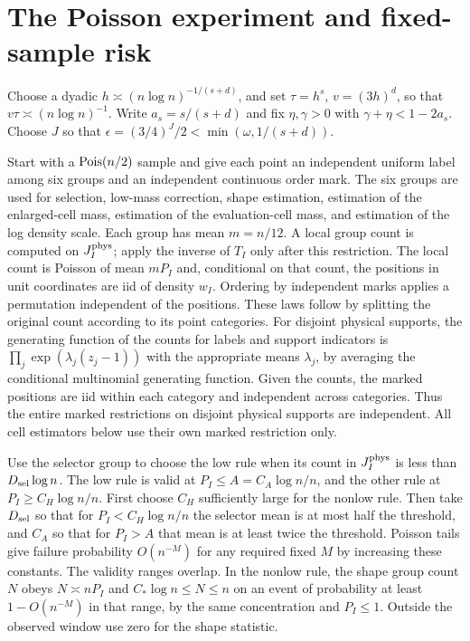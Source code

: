 \section{The Poisson experiment and fixed-sample risk}\label{sec:risk}

Choose a dyadic \(h\asymp(n\log n)^{-1/(s+d)}\), and set
\(\tau=h^s\), \(v=(3h)^d\), so that \(v\tau\asymp(n\log n)^{-1}\).
Write \(a_s=s/(s+d)\) and fix \(\eta,\gamma>0\) with
\(\gamma+\eta<1-2a_s\). Choose \(J\) so that
\(\epsilon=(3/4)^J/2<\min(\omega,1/(s+d))\).

Start with a \(\operatorname{Pois}(n/2)\) sample and give each point an
independent uniform label among six groups and an independent
continuous order mark. The six groups are used for selection,
low-mass correction, shape estimation, estimation of the
enlarged-cell mass, estimation of the evaluation-cell mass,
and estimation of the log density scale. Each group has
mean \(m=n/12\).
A local group count is computed on \(J_I^{\rm phys}\);
apply the inverse of \(T_I\) only after this restriction.
The local count is Poisson of mean \(mP_I\) and, conditional
on that count, the positions in unit coordinates are iid
of density \(w_I\). Ordering by independent marks applies a
permutation independent of the positions. These laws follow
by splitting the original count according to its point
categories. For disjoint physical supports, the generating
function of the counts for labels and support indicators is
\(\prod_j\exp(\lambda_j(z_j-1))\) with the appropriate means
\(\lambda_j\), by averaging the conditional multinomial
generating function. Given the counts, the marked positions
are iid within each category and independent across categories.
Thus the entire marked restrictions on disjoint physical
supports are independent. All cell estimators below use their
own marked restriction only.

Use the selector group to choose the low rule when its
count in \(J_I^{\rm phys}\) is less than \(D_{\rm sel}\log n\).
The low rule is valid at \(P_I\le A=C_A\log n/n\), and the
other rule at \(P_I\ge C_H\log n/n\).
First choose \(C_H\) sufficiently large for the nonlow rule.
Then take \(D_{\rm sel}\) so that for
\(P_I<C_H\log n/n\) the selector mean is at most half the
threshold, and \(C_A\) so that for \(P_I>A\) that mean
is at least twice the threshold. Poisson tails give failure
probability \(O(n^{-M})\) for any required fixed \(M\) by
increasing these constants. The validity ranges overlap.
In the nonlow rule, the shape group count \(N\) obeys
\(N\asymp nP_I\) and \(C_*\log n\le N\le n\) on an
event of probability at least \(1-O(n^{-M})\) in that
range, by the same concentration and \(P_I\le1\).
Outside the observed window use zero for the shape statistic.

